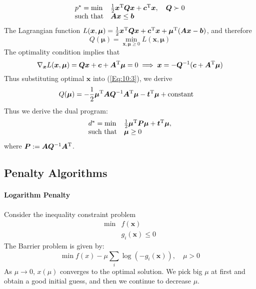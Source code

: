 \begin{example}
\begin{equation}
\begin{array}{ll}
p^*=\min&\frac{1}{2}\bm x^{\mathrm T}\bm Q\bm x+\bm c^{\mathrm T}\bm x,\quad\bm Q\succ0\\
\mbox{such that}&\bm{Ax}\le\bm b
\end{array}
\end{equation}
The Lagrangian function $L(\bm x,\bm\mu)=\frac{1}{2}\bm x^{\mathrm T}\bm Q\bm x+\bm c^{\mathrm T}\bm x+\bm\mu^{\mathrm T}(\bm{Ax}-\bm b)$, and therefore
\begin{equation}\label{Eq:10:3}
Q(\bm\mu)=\min_{\bm x,\bm\mu\ge0}L(\bm x,\bm\mu)
\end{equation}
The optimality condition implies that
\[
\nabla_{\bm x}L(\bm x,\bm\mu)=\bm{Qx}+\bm c+\bm A^{\mathrm T}\bm\mu=0\implies
\bm x=-\bm Q^{-1}(\bm c+\bm A^{\mathrm T}\bm\mu)
\]
Thus substituting optimal $\bm x$ into (\ref{Eq:10:3}), we derive
\begin{align*}
Q(\bm\mu)&=-\frac{1}{2}\bm\mu^{\mathrm T}\bm A\bm Q^{-1}\bm A^{\mathrm T}\bm\mu-\bm t^{\mathrm T}\bm\mu+\mbox{constant}
\end{align*}
Thus we derive the dual program:
\begin{equation}
\begin{array}{ll}
d^*=\min&\frac{1}{2}\bm\mu^{\mathrm T}\bm P\bm\mu+\bm t^{\mathrm T}\bm\mu,\\
\mbox{such that}&\bm\mu\ge0
\end{array}
\end{equation}
where $\bm P:=\bm A\bm Q^{-1}\bm A^{\mathrm T}$.
\end{example}
\subsection{Penalty Algorithms}
\paragraph{Logarithm Penalty}
Consider the inequality constraint problem
\[
\begin{array}{ll}
\min&f(\bm x)\\
&g_i(\bm x)\le0
\end{array}
\]
The Barrier problem is given by:
\[
\min f(x)-\mu\sum_{i}\log(-g_i(\bm x)),\quad\mu>0
\]
As $\mu\to0$, $x(\mu)$ converges to the optimal solution. We pick big $\mu$ at first and obtain a good initial guess, and then we continue to decrease $\mu$.
